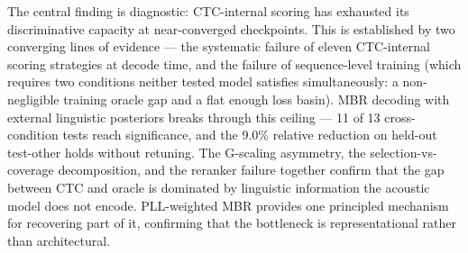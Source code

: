 The central finding is diagnostic: CTC-internal scoring has exhausted its discriminative capacity at near-converged checkpoints. This is established by two converging lines of evidence — the systematic failure of eleven CTC-internal scoring strategies at decode time, and the failure of sequence-level training (which requires two conditions neither tested model satisfies simultaneously: a non-negligible training oracle gap and a flat enough loss basin). MBR decoding with external linguistic posteriors breaks through this ceiling — 11 of 13 cross-condition tests reach significance, and the 9.0\% relative reduction on held-out test-other holds without retuning. The G-scaling asymmetry, the selection-vs-coverage decomposition, and the reranker failure together confirm that the gap between CTC and oracle is dominated by linguistic information the acoustic model does not encode. PLL-weighted MBR provides one principled mechanism for recovering part of it, confirming that the bottleneck is representational rather than architectural.




